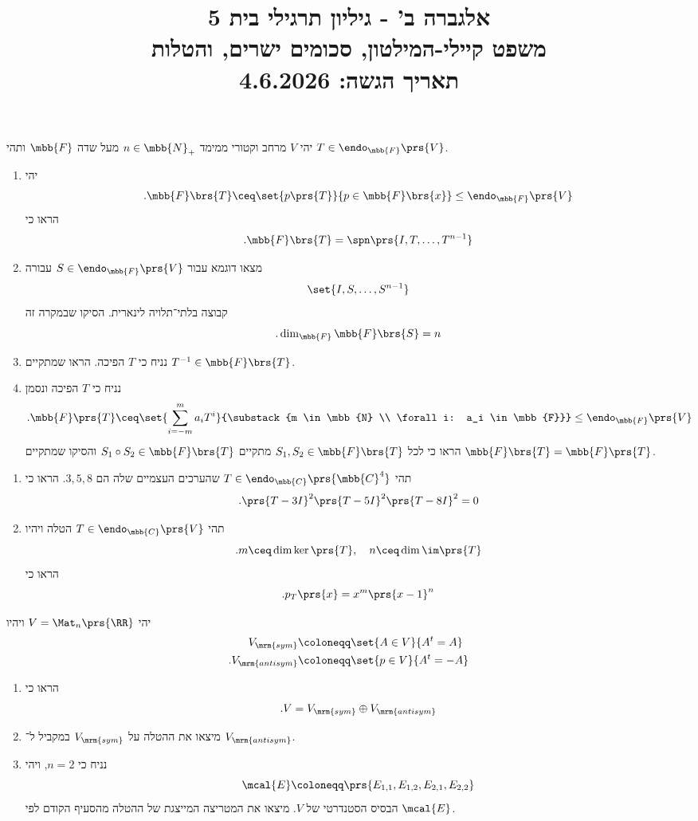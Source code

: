 \documentclass[a4paper,10pt,twoside,openany]{article}
\title{
אלגברה ב' - גיליון תרגילי בית 5 \\
משפט קיילי-המילטון, סכומים ישרים, והטלות
\\
\vspace{1cm}
\large{תאריך הגשה: 4.6.2026}
}
\date{}
\begin{document}
\maketitle

\begin{exercise}%
יהי
$V$
מרחב וקטורי ממימד
$n \in \mbb{N}_+$
מעל שדה
$\mbb{F}$
ותהי
$T \in \endo_{\mbb{F}}\prs{V}$.

\begin{enumerate}
\item
יהי
\[\text{.} \mbb{F}\brs{T} \ceq \set{p\prs{T}}{p \in \mbb{F}\brs{x}} \leq \endo_{\mbb{F}}\prs{V}\]
 הראו כי
\[\text{.} \mbb{F}\brs{T} = \spn\prs{I, T, \ldots, T^{n-1}}\]

\item
מצאו דוגמא עבור
$S \in \endo_{\mbb{F}}\prs{V}$
עבורה
\[\set{I, S, \ldots, S^{n-1}}\]
קבוצה בלתי־תלויה לינארית. הסיקו שבמקרה זה
\[\text{.} \dim_{\mbb{F}} \mbb{F}\brs{S} = n\]

\item
נניח כי
$T$
הפיכה. הראו שמתקיים
$T^{-1} \in \mbb{F}\brs{T}$.

\item נניח כי
$T$
הפיכה ונסמן
\[\text{.} \mbb{F}\prs{T} \ceq \set{\sum_{i=-m}^m a_i T^i}{\substack{m \in \mbb{N} \\ \forall i: a_i \in \mbb{F}}} \leq \endo_{\mbb{F}}\prs{V}\]
הראו כי לכל
$S_1, S_2 \in \mbb{F}\brs{T}$
מתקיים
$S_1 \circ S_2 \in \mbb{F}\brs{T}$
והסיקו שמתקיים
$\mbb{F}\brs{T} = \mbb{F}\prs{T}$.
\end{enumerate}
\end{exercise}

\begin{exercise} %
\begin{enumerate}
\item תהי
$T \in \endo_{\mbb{C}}\prs{\mbb{C}^4}$
שהערכים העצמיים שלה הם
$3,5,8$.
הראו כי
\[\text{.} \prs{T - 3I}^2\prs{T - 5I}^2 \prs{T - 8I}^2 = 0\]
\item תהי
$T \in \endo_{\mbb{C}}\prs{V}$
הטלה ויהיו
\[\text{.} m \ceq \dim \ker \prs{T}, \quad n \ceq \dim \im \prs{T}\]
הראו כי
\[\text{.} p_T\prs{x} = x^m \prs{x-1}^n\]
\end{enumerate}
\end{exercise}

\begin{exercise} %
יהי
$V = \Mat_n\prs{\RR}$
ויהיו
\begin{align*}
V_{\mrm{sym}} &\coloneqq \set{A \in V}{A^t = A} \\
\text{.} V_{\mrm{antisym}} &\coloneqq \set{p \in V}{A^t = -A}
\end{align*}
\begin{enumerate}
\item
הראו כי
\[\text{.}V = V_{\mrm{sym}} \oplus V_{\mrm{antisym}}\]
\item
מיצאו את ההטלה על
$V_{\mrm{sym}}$
במקביל ל־%
$V_{\mrm{antisym}}$.
\item
נניח כי
$n = 2$,
ויהי
\[\mcal{E} \coloneqq \prs{E_{1,1}, E_{1,2}, E_{2,1}, E_{2,2}}\]
הבסיס הסטנדרטי של
$V$.
מיצאו את המטריצה המייצגת של ההטלה מהסעיף הקודם לפי
$\mcal{E}$.
\end{enumerate}
\end{exercise}
\end{document}
